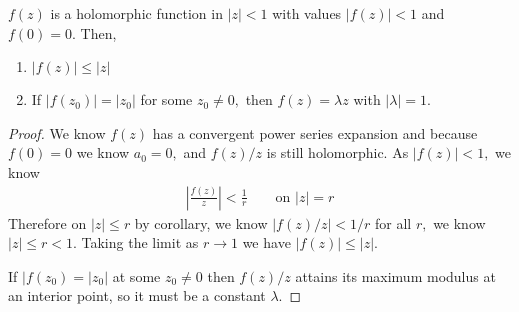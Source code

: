 \documentclass[a4paper,12pt]{article}
\begin{document}
\begin{theorem}
    $f(z)$ is a holomorphic function in $|z|<1$ with values $|f(z)|<1$ and $f(0)=0.$ Then, \begin{enumerate}
        \item $|f(z)|\leq|z|$
        \item If $|f(z_0)|=|z_0|$ for some $z_0\neq0,$ then $f(z)=\lambda z$ with $|\lambda|=1.$
    \end{enumerate}
    \begin{proof}
        We know $f(z)$ has a convergent power series expansion and because $f(0)=0$ we know $a_0=0,$ and $f(z)/z$ is still holomorphic. As $|f(z)|<1,$ we know \begin{align}
            \left|\frac{f(z)}{z}\right|<\frac{1}{r}\qquad\text{on }|z|=r
        \end{align}
        Therefore on $|z|\leq r$ by corollary, we know $|f(z)/z|<1/r$ for all $r,$ we know $|z|\leq r<1.$ Taking the limit as $r\to1$ we have $|f(z)|\leq|z|.$

        If $|f(z_0)=|z_0|$ at some $z_0\neq 0$ then $f(z)/z$ attains its maximum modulus at an interior point, so it must be a constant $\lambda.$
    \end{proof}
\end{theorem}
\end{document}
